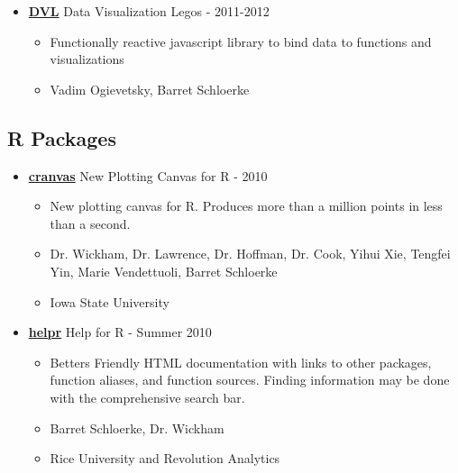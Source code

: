 \documentclass[oneside]{article}
\begin{document}
    \begin{itemize}
      \item {\bf \href{http://github.com/vogievetsky/DVL}{DVL}} Data Visualization Legos - 2011-2012
        \begin{itemize}
          \item Functionally reactive javascript library to bind data to functions and visualizations
          \item Vadim Ogievetsky, Barret Schloerke
        \end{itemize}
    \end{itemize}

    \subsection{R Packages}
    \begin{itemize}
      \item{\bf \href{http://github.com/ggobi/cranvas/}{cranvas}} New Plotting Canvas for R - 2010
        \begin{itemize}
          \item New plotting canvas for R.  Produces more than a million points in less than a second.
          \item Dr. Wickham, Dr. Lawrence, Dr. Hoffman, Dr. Cook, Yihui Xie, Tengfei Yin, Marie Vendettuoli, Barret Schloerke
          \item Iowa State University
        \end{itemize}
      
      \item{\bf \href{http://github.com/hadley/helpr/}{helpr}} Help for R - Summer 2010
        \begin{itemize}
          \item Betters Friendly HTML documentation with links to other packages, function aliases, and function sources.  Finding information may be done with the comprehensive search bar.
          \item Barret Schloerke, Dr. Wickham
          \item Rice University and Revolution Analytics
        \end{itemize}
    
      

\end{itemize}
\end{document}
